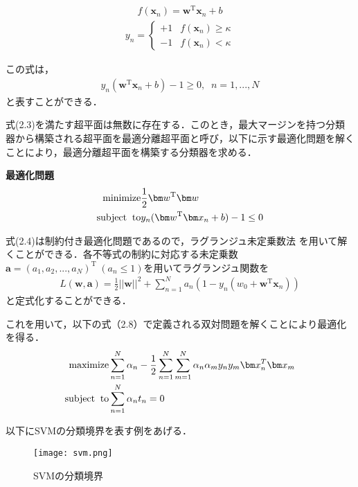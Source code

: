 \begin{eqnarray}
f({\bm x}_{n})={\bm w}^{\mathrm{T}}{\bm x}_{n}+b
\end{eqnarray}
\begin{eqnarray}
y_{n}=
\begin{cases}
+1 &f({\bm x}_{n})\ge \kappa \\
-1 & f({\bm x}_{n})< \kappa 
\end{cases}
\end{eqnarray}

この式は，
\begin{eqnarray}
y_{n}({\bm w}^{\mathrm{T}}{\bm x}_{n}+b)-1\ge0 ,\;\;n=1,...,N
\end{eqnarray}
と表すことができる．

式(2.3)を満たす超平面は無数に存在する．このとき，最大マージンを持つ分類器から構築される超平面を最適分離超平面と呼び，以下に示す最適化問題を解くことにより，最適分離超平面を構築する分類器を求める．\par
{\bf 最適化問題}
\begin{eqnarray}
\text{minimize} & \frac{1}{2} {\bm w}^{\mathrm{T}}{\bm w} \nonumber \\
\text{subject\;\;to} & y_{n}({\bm w}^{\mathrm{T}}{\bm x}_{n}+b)-1\le0
\end{eqnarray}

式(2.4)は制約付き最適化問題であるので，ラグランジュ未定乗数法 \cite{Platt98}を用いて解くことができる．各不等式の制約に対応する未定乗数${\bm a}=(a_{1},a_{2},...,a_{N})^{\mathrm{T}}\;(a_{n}\le 1)$を用いてラグランジュ関数を
\begin{eqnarray}
L({\bm w},{\bm a})=\frac{1}{2}||{\bm w}||^{2}+\sum^{N}_{n=1}a_{n}(1-y_{n}(w_{0}+{\bm w}^{\mathrm{T}}{\bm x}_{n}))
\end{eqnarray}
と定式化することができる．

これを用いて，以下の式（2.8）で定義される双対問題を解くことにより最適化を得る．
\begin{eqnarray}
\text{maximize} & \sum^{N}_{n=1}\alpha_n - \frac{1}{2}\sum^{N}_{n=1}\sum^{N}_{m=1}\alpha_{n}\alpha_{m}y_{n}y_{m}{\bm x}_{n}^{T}{\bm x}_{m}\nonumber \\
\text{subject\;\;to} & \sum^{N}_{n=1}\alpha_{n}t_{n}=0
\end{eqnarray}


以下にSVMの分類境界を表す例をあげる．
\begin{figure}[H]
\centering
\texttt{[image: svm.png]}
\caption{SVMの分類境界}
\label{SVM}
\end{figure}

